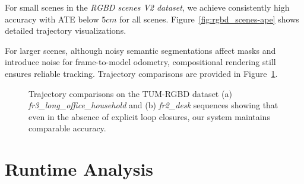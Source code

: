 For small scenes in the \textit{RGBD scenes V2 dataset}, we achieve consistently high accuracy with ATE below $5cm$ for all scenes. Figure~\ref{fig:rgbd_scenes-ape} shows detailed trajectory visualizations.

For larger scenes, although noisy semantic segmentations affect masks and introduce noise for frame-to-model odometry, compositional rendering still ensures reliable tracking. Trajectory comparisons are provided in Figure~\ref{fig:fr3_household-ape}.


\begin{figure}[t!]
    \centering
    \caption{Trajectory comparisons on the TUM-RGBD dataset (a) \emph{fr3\_long\_office\_household} and (b) \emph{fr2\_desk} sequences showing that even in the absence of explicit loop closures, our system maintains comparable accuracy.}
    \vspace*{-1em}
    \label{fig:fr3_household-ape}
\end{figure}
\section{Runtime Analysis}


